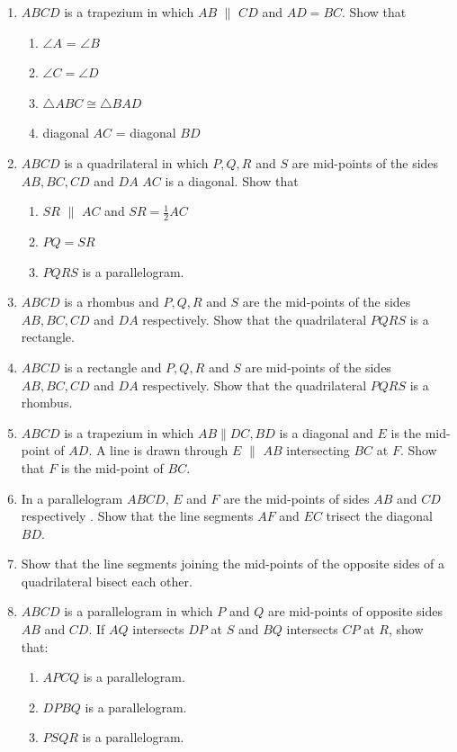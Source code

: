 \begin{enumerate}[label=\arabic*.,ref=\thesubsection.\theenumi]
\item $ABCD$ is a trapezium in which $AB$  $\parallel$  $CD$ and $AD = BC$. Show that 
\begin{enumerate} 
\item$\angle A$ =  $\angle B$  
\item  $\angle C  =  \angle D$  \item  $\triangle  ABC  \cong   \triangle  BAD$ 
\item diagonal $AC$ = diagonal $BD$ 
\end{enumerate}
%
\item $ABCD$ is a quadrilateral in which $P, Q, R$ and $S$ are mid-points of the sides $AB, BC, CD$ and $DA$ $AC$ is a diagonal. Show that 
\begin{enumerate} 
\item $SR$  $\parallel$  $AC$ and $SR =\frac{1}{ 2}AC$
\item $PQ = SR$ 
\item  $PQRS$  is a parallelogram.
\end{enumerate}
%
\item $ABCD$ is a rhombus and  $P, Q, R$ and $S$  are the mid-points of the sides  $AB, BC, CD$ and $DA$ respectively. Show that the quadrilateral  $PQRS$  is a rectangle.
\item $ABCD$ is a rectangle and  $P, Q, R$ and $S$  are mid-points of the sides  $AB, BC, CD$ and $DA$ respectively. Show that the quadrilateral  $PQRS$  is a rhombus.
\item $ABCD$ is a trapezium in which $AB  \parallel  DC, BD$ is a diagonal and $E$ is the mid-point of $AD$. A line is drawn through $E$ $\parallel$  $AB$ intersecting $BC$ at $F$. Show that $F$ is the mid-point of $BC$.
\item In a parallelogram $ABCD$, $E$ and $F$ are the mid-points of sides $AB$ and $CD$ respectively . Show that the line segments $AF$ and $EC$ trisect the diagonal $BD$.
\item Show that the line segments joining the mid-points of the opposite sides of a quadrilateral bisect each other.
\item $ABCD$ is a parallelogram in which $P$ and $Q$ are mid-points of opposite sides $AB$ and $CD$. If $AQ$ intersects $DP$ at $S$ and $BQ$ intersects $CP$ at $R$, show that: 
%
\begin{enumerate}
\item  $APCQ$ is a parallelogram. 
\item $DPBQ$ is a parallelogram. 
\item $PSQR$ is a parallelogram.

\end{enumerate}
\end{enumerate}
